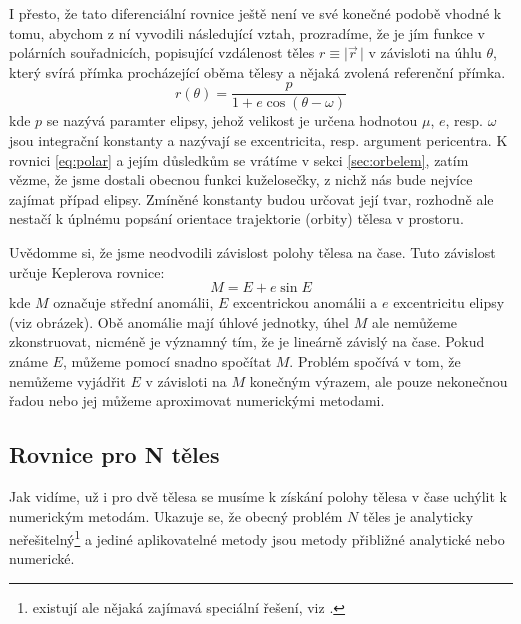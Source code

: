 \documentclass[A4paper, 12pt, oneside]{book}
\newcommand{\abs}[1]{\lvert #1 \,\rvert}
\begin{document}
I přesto, že tato diferenciální rovnice ještě není ve své konečné podobě vhodné k tomu, abychom z ní vyvodili následující vztah, prozradíme, že je jím funkce v polárních souřadnicích, popisující vzdálenost těles $r\equiv\abs{\vec{r}}$ v závisloti na úhlu $\theta$, který svírá přímka procházející oběma tělesy a nějaká zvolená referenční přímka. 
\begin{equation} \label{eq:polar}
	r(\theta)=\frac{p}{1+e\cos{(\theta-\omega)}}
\end{equation}
kde $p$ se nazývá paramter elipsy, jehož velikost je určena hodnotou $\mu$, $e$, resp. $\omega$ jsou integrační konstanty a nazývají se excentricita, resp. argument pericentra. K rovnici \eqref{eq:polar} a jejím důsledkům se vrátíme v sekci \ref{sec:orbelem}, zatím vězme, že jsme dostali obecnou funkci kuželosečky, z nichž nás bude nejvíce zajímat případ elipsy. Zmíněné konstanty budou určovat její tvar, rozhodně ale nestačí k úplnému popsání orientace trajektorie (orbity) tělesa v prostoru. 

Uvědomme si, že jsme neodvodili závislost polohy tělesa na čase. Tuto závislost určuje Keplerova rovnice:
\begin{equation} \label{eq:kepler}
M = E + e\sin E
\end{equation}
kde $M$ označuje střední anomálii, $E$ excentrickou anomálii a $e$ excentricitu elipsy (viz obrázek). Obě anomálie mají úhlové jednotky, úhel $M$ ale nemůžeme zkonstruovat, nicméně je významný tím, že je lineárně závislý na čase. Pokud známe $E$, můžeme pomocí snadno spočítat $M$.  Problém spočívá v tom, že nemůžeme vyjádřit $E$ v závisloti na $M$ konečným výrazem, ale pouze nekonečnou řadou nebo jej můžeme aproximovat numerickými metodami.

\subsection{Rovnice pro N těles}
Jak vidíme, už i pro dvě tělesa se musíme k získání polohy tělesa v čase uchýlit k numerickým metodám. Ukazuje se, že obecný problém $N$ těles je analyticky neřešitelný\footnote{existují ale nějaká zajímavá speciální řešení, viz \cite{cohan12}.} a jediné aplikovatelné metody jsou metody přibližné analytické nebo numerické.
\end{document}

